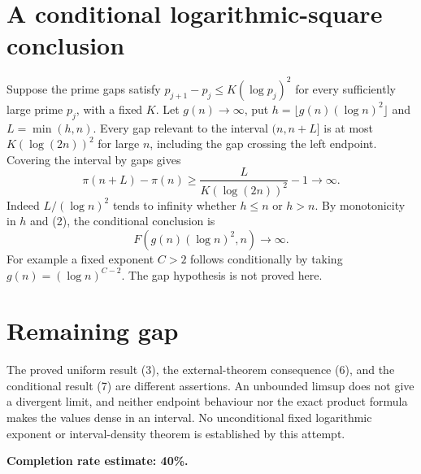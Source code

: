 \documentclass[11pt]{article}
\begin{document}
\section*{A conditional logarithmic-square conclusion}
Suppose the prime gaps satisfy $p_{j+1}-p_j\le K(\log p_j)^2$ for every sufficiently large prime $p_j$, with a fixed $K$. Let $g(n)\to\infty$, put $h=\lfloor g(n)(\log n)^2\rfloor$ and $L=\min(h,n)$. Every gap relevant to the interval $(n,n+L]$ is at most $K(\log(2n))^2$ for large $n$, including the gap crossing the left endpoint. Covering the interval by gaps gives
\[
 \pi(n+L)-\pi(n)\ge\frac{L}{K(\log(2n))^2}-1\longrightarrow\infty.
\]
Indeed $L/(\log n)^2$ tends to infinity whether $h\le n$ or $h>n$. By monotonicity in $h$ and (2), the conditional conclusion is
\[
 F(g(n)(\log n)^2,n)\longrightarrow\infty. \tag{7}
\]
For example a fixed exponent $C>2$ follows conditionally by taking $g(n)=(\log n)^{C-2}$. The gap hypothesis is not proved here.

\section*{Remaining gap}
The proved uniform result (3), the external-theorem consequence (6), and the conditional result (7) are different assertions. An unbounded limsup does not give a divergent limit, and neither endpoint behaviour nor the exact product formula makes the values dense in an interval. No unconditional fixed logarithmic exponent or interval-density theorem is established by this attempt.

\textbf{Completion rate estimate: 40\%.}
\end{document}
